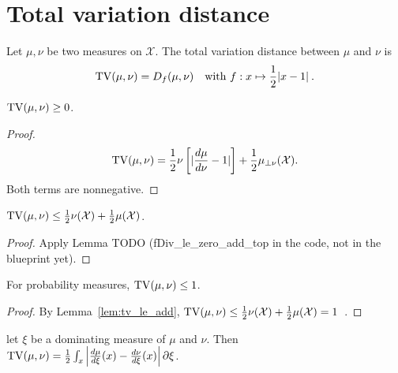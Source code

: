 \section{Total variation distance}

\begin{definition}[TV distance]
  \label{def:TV}
  \leanok
  Let $\mu, \nu$ be two measures on $\mathcal X$. The total variation distance between $\mu$ and $\nu$ is
  \begin{align*}
  \operatorname{TV}(\mu, \nu) = D_f(\mu, \nu) \quad \text{with } f: x \mapsto \frac{1}{2}\vert x - 1 \vert \: .
  \end{align*}
\end{definition}

\begin{lemma}
  \label{lem:tv_nonneg}
  $\operatorname{TV}(\mu, \nu) \ge 0$.
\end{lemma}

\begin{proof}
\begin{align*}
\operatorname{TV}(\mu, \nu)
= \frac{1}{2}\nu\left[ \vert \frac{d\mu}{d\nu} - 1 \vert \right] + \frac{1}{2}\mu_{\perp \nu}(\mathcal X).
\end{align*}
Both terms are nonnegative.
\end{proof}

\begin{lemma}
  \label{lem:tv_le_add}
  $\operatorname{TV}(\mu, \nu) \le \frac{1}{2}\nu(\mathcal X) + \frac{1}{2}\mu(\mathcal X)$.
\end{lemma}

\begin{proof}
Apply Lemma TODO (fDiv\_le\_zero\_add\_top in the code, not in the blueprint yet).
\end{proof}


\begin{lemma}
  \label{lem:tv_le_one}
  For probability measures,
  $\operatorname{TV}(\mu, \nu) \le 1$.
\end{lemma}

\begin{proof}
By Lemma~\ref{lem:tv_le_add}, $\operatorname{TV}(\mu, \nu) \le \frac{1}{2}\nu(\mathcal X) + \frac{1}{2}\mu(\mathcal X) = 1$~.
\end{proof}

\begin{lemma}
  \label{lem:tv_eq_integral_abs}
  let $\xi$ be a dominating measure of $\mu$ and $\nu$. Then
  $\operatorname{TV}(\mu, \nu) = \frac{1}{2}\int_x \left\vert \frac{d\mu}{d\xi}(x) - \frac{d\nu}{d\xi}(x) \right\vert \partial\xi$.
\end{lemma}

